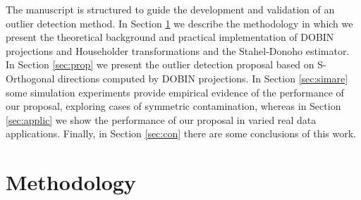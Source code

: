 \documentclass[12pt]{article}
\begin{document}
The manuscript is structured to guide the development and validation of an outlier detection method. In Section \ref{sec:met} we describe the methodology in which we present the theoretical background and practical implementation of DOBIN projections and Householder transformations and the Stahel-Donoho estimator. In Section \ref{sec:prop} we present the outlier detection proposal based on S-Orthogonal directions computed by DOBIN projections. In Section \ref{sec:simare} some simulation experiments provide empirical evidence of the performance of our proposal, exploring cases of symmetric contamination, whereas in Section \ref{sec:applic} we show the performance of our proposal in varied real data applications. Finally, in Section \ref{sec:con} there are some conclusions of this work.

\section{Methodology}\label{sec:met}


\end{document}

